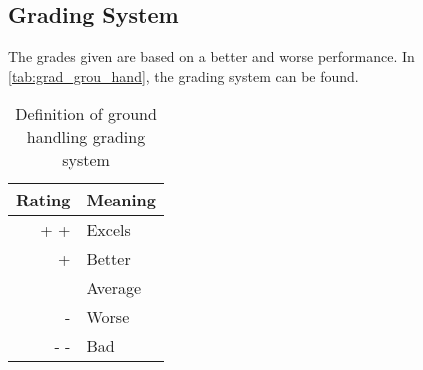 \begin{comment}
\begin{table}[]
    \centering
    \caption{Ground Handling Sub Trade-off}
    \label{tab:summ_grou_hand}
    \begin{tabular}{r|>{\centering}p{2.5cm}:>{\centering}p{0.5cm}:>{\centering}p{1.25cm}:>{\centering}p{2cm}:>{\centering}p{2.5cm}|C}
    \textbf{Concept \rotatebox{90}{\hspace{0.5cm}Criterion}}            & 
    \rotatebox{90}{\textbf{Assembly}}                                   &
    \rotatebox{90}{\textbf{Dimensions}}                                 & 
    \rotatebox{90}{\textbf{Mass}}                                       & 
    \rotatebox{90}{\multicolumn{1}{p{2cm}}{\raggedright \textbf{Payload mounting}}}  & 
    \rotatebox{90}{\textbf{Maintenance}}                                &
    \rotatebox{90}{\textbf{Outcome}}
    \\ \midrule
    Tailsitter      &  +    & - -   &  +     &  + +  &   -   & 60\% 
    \\\hdashline
    Tandem          & - -   & + +   &  -     &   0   &   0   & 38\% 
    \\\hdashline
    Prandtl Box     &  0    & + +   & + +    &   -   &   +   & 54\% 
    \\\hdashline
    Tiltrotor       &  -    & -     &  -     &  + +  &  0    & 51\% 
    \\\hdashline
    Winged Quad.    &  +    & 0     & + +    &  + +  &  +    & 82\% 
    \\ \midrule\midrule
    Weight          & 27    & 10     & 15   & 21    & 27    &  
    \end{tabular}
\end{table}
\end{comment}

\subsection{Grading System}

The grades given are based on a better and worse performance. In \autoref{tab:grad_grou_hand}, the grading system can be found.
\begin{table}[]
    \centering
    \caption{Definition of ground handling grading system}
    \label{tab:grad_grou_hand}
    \begin{tabular}{r l}
    \toprule
     Rating    & Meaning 
     \\ \midrule
     + + & Excels 
    \\ \hdashline
    + & Better
    \\ \hdashline
    0 & Average
    \\ \hdashline
    - & Worse
    \\ \hdashline
    - - & Bad
    \\ \bottomrule
    \end{tabular}
\end{table}



